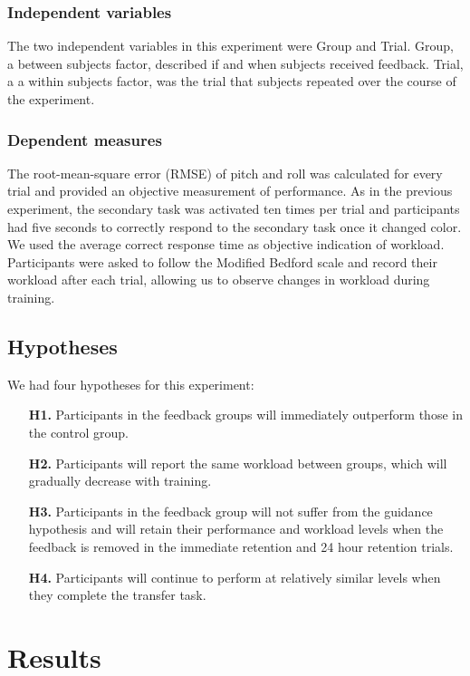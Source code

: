 \subsubsection{Independent variables}
The two independent variables in this experiment were Group and Trial.
Group, a between subjects factor, described if and when subjects received feedback.
Trial, a a within subjects factor, was the trial that subjects repeated over the course of the experiment.

\subsubsection{Dependent measures}
The root-mean-square error (RMSE) of pitch and roll was calculated for every trial and provided an objective measurement of performance.
As in the previous experiment, the secondary task was activated ten times per trial and participants had five seconds to correctly respond to the secondary task once it changed color.
We used the average correct response time as objective indication of workload.
Participants were asked to follow the Modified Bedford scale and record their workload after each trial, allowing us to observe changes in workload during training.

\subsection{Hypotheses}
We had four hypotheses for this experiment:
\begin{itemize}
    \item[\textbf{H1.}] Participants in the feedback groups will immediately outperform those in the control group.
    \item[\textbf{H2.}] Participants will report the same workload between groups, which will gradually decrease with training.
    \item[\textbf{H3.}] Participants in the feedback group will not suffer from the guidance hypothesis and will retain their performance and workload levels when the feedback is removed in the immediate retention and 24 hour retention trials.
    \item[\textbf{H4.}] Participants will continue to perform at relatively similar levels when they complete the transfer task.
\end{itemize}

\section{Results}
